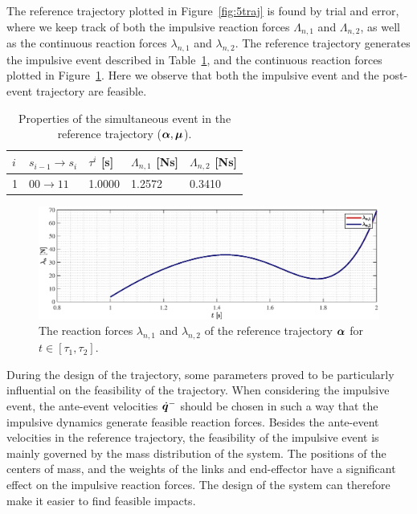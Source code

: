 \documentclass[../DC2019003Bouma.tex]{subfiles}
\begin{document}
The reference trajectory plotted in Figure~\ref{fig:5traj} is found by trial and error, where we keep track of both the impulsive reaction forces $\Lambda_{n,1}$ and $\Lambda_{n,2}$, as well as the continuous reaction forces $\lambda_{n,1}$ and $\lambda_{n,2}$. The reference trajectory generates the impulsive event described in Table~\ref{tab:simevent}, and the continuous reaction forces plotted in Figure~\ref{fig:5lambdaref}. Here we observe that both the impulsive event and the post-event trajectory are feasible.
\begin{table}[h!]
\centering
\caption{Properties of the simultaneous event in the reference trajectory ($\boldsymbol{\alpha},\boldsymbol{\mu}$).}\label{tab:simevent}
\begin{tabular}{l|l|l|l|l}
$i$ & $s_{i-1}\rightarrow s_i$ & $\tau^i$ {[}s{]} & $\Lambda_{n,1}$ {[}Ns{]} & $\Lambda_{n,2}$ {[}Ns{]} \\ \hline
1   & $00\rightarrow 11$       & 1.0000        & 1.2572                   & 0.3410        
\end{tabular}
\end{table}
\begin{figure}[h!]
\centering
\includegraphics[width=.8\textwidth]{lambdaref.eps}\caption{The reaction forces $\lambda_{n,1}$ and $\lambda_{n,2}$ of the reference trajectory $\boldsymbol{\alpha}$ for $t\in [\tau_1,\tau_2]$.}\label{fig:5lambdaref}
\end{figure}

During the design of the trajectory, some parameters proved to be particularly influential on the feasibility of the trajectory. When considering the impulsive event, the ante-event velocities $\dot{{\boldsymbol{q}}}^-$ should be chosen in such a way that the impulsive dynamics generate feasible reaction forces. Besides the ante-event velocities in the reference trajectory, the feasibility of the impulsive event is mainly governed by the mass distribution of the system. The positions of the centers of mass, and the weights of the links and end-effector have a significant effect on the impulsive reaction forces. The design of the system can therefore make it easier to find feasible impacts.
\end{document}
